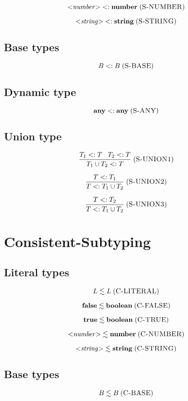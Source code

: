 \documentclass[12pt]{article}
\newcommand{\Any}{\mathbf{any}}
\newcommand{\False}{\mathbf{false}}
\newcommand{\True}{\mathbf{true}}
\newcommand{\Boolean}{\mathbf{boolean}}
\newcommand{\Number}{\mathbf{number}}
\newcommand{\String}{\mathbf{string}}
\newcommand{\mylabel}[1]{\; (\textsc{#1})}
\newcommand{\subtype}{<:}
\begin{document}
\[
{<}{\it number}{>} \subtype \Number
\mylabel{S-NUMBER}
\]

\[
{<}{\it string}{>} \subtype \String
\mylabel{S-STRING}
\]

\subsection{Base types}

\[
B \subtype B
\mylabel{S-BASE}
\]

\subsection{Dynamic type}

\[
\Any \subtype \Any
\mylabel{S-ANY}
\]

\subsection{Union type}

\[
\frac{T_{1} \subtype T \;\;\; T_{2} \subtype T}
     {T_{1} \cup T_{2} \subtype T}
\mylabel{S-UNION1}
\]

\[
\frac{T \subtype T_{1}}
     {T \subtype T_{1} \cup T_{2}}
\mylabel{S-UNION2}
\]

\[
\frac{T \subtype T_{2}}
     {T \subtype T_{1} \cup T_{2}}
\mylabel{S-UNION3}
\]

\section{Consistent-Subtyping}

\subsection{Literal types}

\[
L \lesssim L
\mylabel{C-LITERAL}
\]

\[
\False \lesssim \Boolean
\mylabel{C-FALSE}
\]

\[
\True \lesssim \Boolean
\mylabel{C-TRUE}
\]

\[
{<}{\it number}{>} \lesssim \Number
\mylabel{C-NUMBER}
\]

\[
{<}{\it string}{>} \lesssim \String
\mylabel{C-STRING}
\]

\subsection{Base types}

\[
B \lesssim B
\mylabel{C-BASE}
\]
\end{document}
